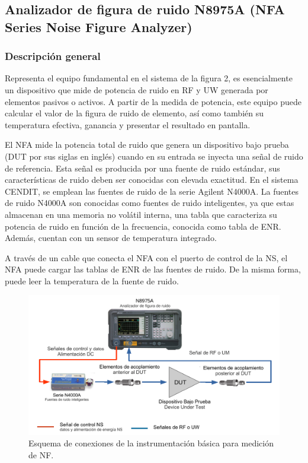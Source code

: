\subsection{Analizador de figura de ruido N8975A (NFA Series Noise Figure Analyzer)}
\subsubsection{Descripción general}

Representa el equipo fundamental en el sistema de la figura 2, es esencialmente un dispositivo que mide de potencia de ruido en RF y UW generada por elementos pasivos o activos. A partir de la medida de potencia, este equipo puede	calcular el valor de la figura de ruido de elemento, así como también su temperatura efectiva, ganancia y presentar el resultado en pantalla. 

El NFA mide la potencia total de ruido que genera un dispositivo bajo prueba (DUT por sus siglas en inglés) cuando en su entrada se inyecta una señal de ruido de referencia. Esta señal es producida por una fuente de ruido estándar, sus características de ruido deben ser conocidas con elevada exactitud. En el sistema CENDIT, se emplean las fuentes de ruido de la serie Agilent N4000A. La fuentes de ruido N4000A son conocidas como fuentes de ruido inteligentes, ya que	estas almacenan en una memoria no volátil interna, una tabla que caracteriza su potencia de ruido en función de la frecuencia, conocida como tabla de ENR. Además, cuentan con un sensor de temperatura integrado.

A través de un cable que conecta el NFA con el puerto de control de la NS, el NFA puede cargar las tablas de ENR de las fuentes de ruido. De la misma forma, puede leer la temperatura de la fuente de ruido.

\begin{figure}[h!]
	\centering
	\includegraphics[width=15cm]{./Imagenes/EsquemaConexionNFADUT.pdf}
	\caption{Esquema de conexiones de la instrumentación básica para medición de NF.}
\label{Fig:BancoPruebasFuenteRuido}
\end{figure}


